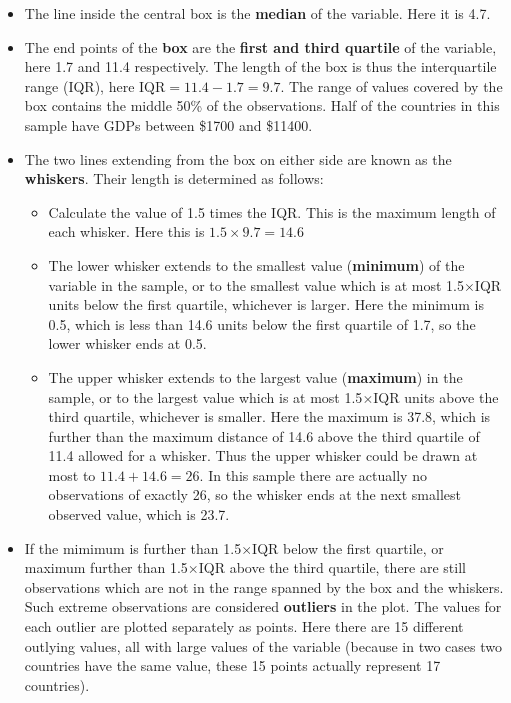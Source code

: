 \documentclass[11pt,a4paper,openany]{book}
\begin{document}
\begin{itemize}
\item
  The line inside the central box is the \textbf{median} of the
  variable. Here it is 4.7.
\item
  The end points of the \textbf{box} are the \textbf{first and third
  quartile} of the variable, here 1.7 and 11.4 respectively. The length
  of the box is thus the interquartile range (IQR), here
  \(\text{IQR}=11.4-1.7=9.7\). The range of values covered by the box
  contains the middle 50\% of the observations. Half of the countries in
  this sample have GDPs between \$1700 and \$11400.
\item
  The two lines extending from the box on either side are known as the
  \textbf{whiskers}. Their length is determined as follows:

  \begin{itemize}
  \item
    Calculate the value of 1.5 times the IQR. This is the maximum length
    of each whisker. Here this is \(1.5\times 9.7=14.6\)
  \item
    The lower whisker extends to the smallest value (\textbf{minimum})
    of the variable in the sample, or to the smallest value which is at
    most 1.5\(\times\)IQR units below the first quartile, whichever is
    larger. Here the minimum is 0.5, which is less than 14.6 units below
    the first quartile of 1.7, so the lower whisker ends at 0.5.
  \item
    The upper whisker extends to the largest value (\textbf{maximum}) in
    the sample, or to the largest value which is at most
    1.5\(\times\)IQR units above the third quartile, whichever is
    smaller. Here the maximum is 37.8, which is further than the maximum
    distance of 14.6 above the third quartile of 11.4 allowed for a
    whisker. Thus the upper whisker could be drawn at most to
    \(11.4+14.6=26\). In this sample there are actually no observations
    of exactly 26, so the whisker ends at the next smallest observed
    value, which is 23.7.
  \end{itemize}
\item
  If the mimimum is further than 1.5\(\times\)IQR below the first
  quartile, or maximum further than 1.5\(\times\)IQR above the third
  quartile, there are still observations which are not in the range
  spanned by the box and the whiskers. Such extreme observations are
  considered \textbf{outliers} in the plot. The values for each outlier
  are plotted separately as points. Here there are 15 different outlying
  values, all with large values of the variable (because in two cases
  two countries have the same value, these 15 points actually represent
  17 countries).
\end{itemize}
\end{document}
